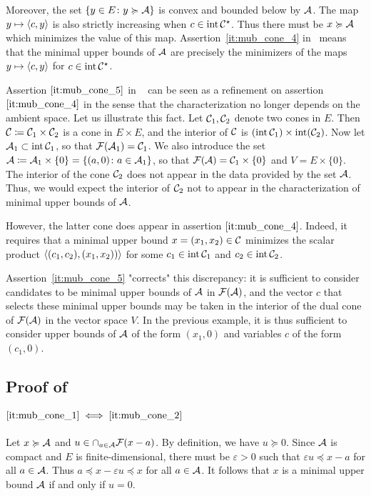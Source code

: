 \documentclass[main]{subfiles}
\begin{document}
Moreover, the set $\{ y \in E \colon y \succcurlyeq \mathcal{A} \}$ is convex and bounded below by $\mathcal{A}$. The map $y \mapsto \langle {c} , {y} \rangle$ is also strictly increasing when $c \in \operatorname{int} \mathcal{C}^\star$. Thus there must be $x \succcurlyeq \mathcal{A}$ which minimizes the value of this map. Assertion~\eqref{it:mub_cone_4} in~ means that the minimal upper bounds of $\mathcal{A}$ are precisely the minimizers of the maps $y \mapsto \langle {c} , {y} \rangle$ for $c \in \operatorname{int} \mathcal{C}^\star$.

Assertion $\eqref{it:mub_cone_5}$ in ~ can be seen as a refinement on assertion $\eqref{it:mub_cone_4}$ in the sense that the characterization no longer depends on the ambient space. Let us illustrate this fact. Let $\mathcal{C}_1, \mathcal{C}_2$ denote two cones in $E$. Then $\mathcal{C} \coloneqq \mathcal{C}_1 \times \mathcal{C}_2$ is a cone in $E \times E$, and the interior of $\mathcal{C}$ is $(\operatorname{int} \mathcal{C}_1) \times \operatorname{int}( \mathcal{C}_2 )$. Now let $\mathcal{A}_1 \subset \operatorname{int} \mathcal{C}_1$, so that $\mathcal{F}(\mathcal{A}_1) = \mathcal{C}_1$.
We also introduce the set $\mathcal{A} \coloneqq \mathcal{A}_1 \times \{0\} = \{ (a,0) \colon a \in \mathcal{A}_1 \}$, so that $\mathcal{F}(\mathcal{A}) = \mathcal{C}_1 \times \{0 \}$ and $V = E \times \{0 \}$. The interior of the cone $\mathcal{C}_2$ does not appear in the data provided by the set $\mathcal{A}$. Thus, we would expect the  interior of $\mathcal{C}_2$ not to appear in the characterization of minimal upper bounds of $\mathcal{A}$. 

However, the latter cone does appear in assertion $\eqref{it:mub_cone_4}$. Indeed, it requires that a minimal upper bound $x = (x_1,x_2) \in \mathcal{C}$ minimizes the scalar product $\langle {(c_1,c_2)} , {(x_1,x_2))} \rangle$ for some $c_1 \in \operatorname{int} \mathcal{C}_1$ and $c_2 \in \operatorname{int} \mathcal{C}_2$.

Assertion~\eqref{it:mub_cone_5} "corrects" this discrepancy: it is sufficient to consider candidates to be minimal upper bounds of $\mathcal{A}$ in $\mathcal{F}(\mathcal{A})$, and the vector $c$ that selects these minimal upper bounds may be taken in the interior of the dual cone of $\mathcal{F}(\mathcal{A})$ in the vector space $V$. In the previous example, it is thus sufficient to consider upper bounds of $\mathcal{A}$ of the form $(x_1, 0)$ and variables $c$ of the form $(c_1, 0)$.


\subsection{\texorpdfstring{Proof of~}{Proof of Theorem 1.2}}
\label{sec:mub_cone_char_proof}

\paragraph{$\eqref{it:mub_cone_1} \iff \eqref{it:mub_cone_2}$}
Let $x \succcurlyeq \mathcal{A}$ and $u \in \cap_{a \in \mathcal{A}} \mathcal{F}(x-a)$. By definition, we have $u \succeq 0$. Since $\mathcal{A}$ is compact and $E$ is finite-dimensional, there must be $\varepsilon > 0$ such that $\varepsilon u \preceq x-a$ for all $a \in \mathcal{A}$. Thus $a \preceq x- \varepsilon u \preceq x$ for all $a \in \mathcal{A}$. It follows that $x$ is a minimal upper bound $\mathcal{A}$ if and only if $u = 0$.
\end{document}

